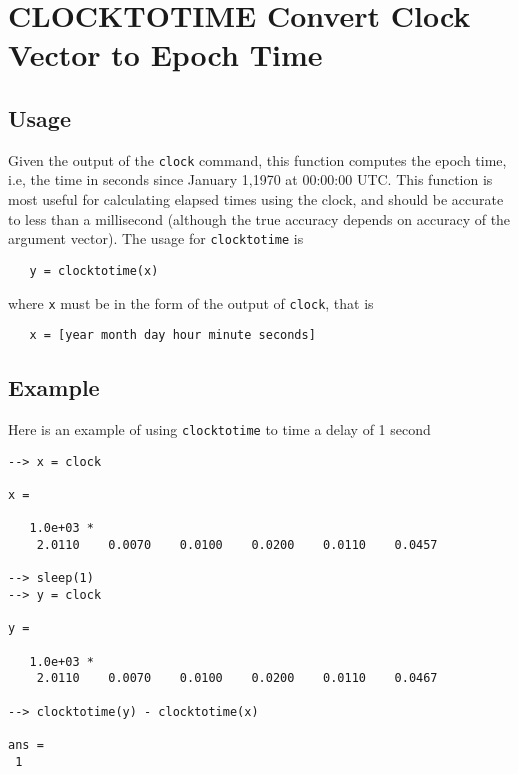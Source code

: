 \section{CLOCKTOTIME Convert Clock Vector to Epoch Time}

\subsection{Usage}

Given the output of the \verb|clock| command, this function computes
the epoch time, i.e, the time in seconds since January 1,1970 
at 00:00:00 UTC.  This function is most useful for calculating elapsed
times using the clock, and should be accurate to less than a millisecond
(although the true accuracy depends on accuracy of the argument vector). 
The usage for \verb|clocktotime| is
\begin{verbatim}
   y = clocktotime(x)
\end{verbatim}
where \verb|x| must be in the form of the output of \verb|clock|, that is
\begin{verbatim}
   x = [year month day hour minute seconds]
\end{verbatim}
\subsection{Example}

Here is an example of using \verb|clocktotime| to time a delay of 1 second
\begin{verbatim}
--> x = clock

x = 

   1.0e+03 * 
    2.0110    0.0070    0.0100    0.0200    0.0110    0.0457 

--> sleep(1)
--> y = clock

y = 

   1.0e+03 * 
    2.0110    0.0070    0.0100    0.0200    0.0110    0.0467 

--> clocktotime(y) - clocktotime(x)

ans = 
 1 
\end{verbatim}
